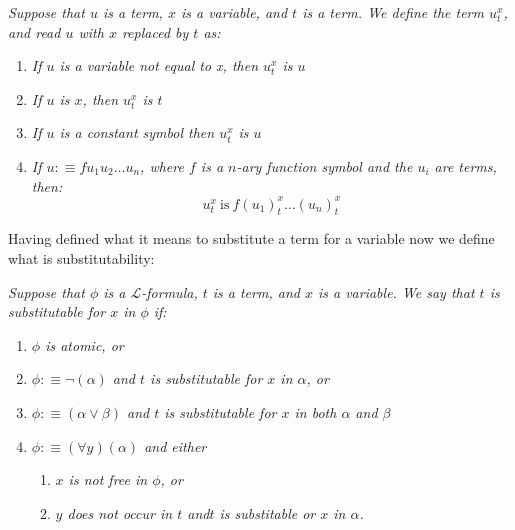 \documentclass[10pt,a4paper]{article}
\newcommand{\curveL}{\mathcal{L}}
\begin{document}
                    \begin{define}
                        \textit{Suppose that $u$ is a term, $x$ is a variable, and $t$ is a term. We define the term $u_t^x$, and read $u$ with $x$ replaced by $t$ as:}
                        \begin{enumerate}
                            \item \textit{If $u$ is a variable not equal to x, then $u_t^x$ is $u$}
                            \item \textit{If $u$ is $x$, then $u_t^x$ is $t$}
                            \item \textit{If $u$ is a constant symbol then $u_t^x$ is $u$}
                            \item \textit{If $u:\equiv fu_1u_2\dots u_n$, where $f$ is a $n$-ary function symbol and the $u_i$ are terms, then:}
                            \begin{equation}
                                u_t^x \ \text{is} \ f(u_1)_t^x\dots(u_n)_t^x
                            \end{equation}
                        \end{enumerate}
                    \end{define}
                    Having defined what it means to substitute a term for a variable now we define what is substitutability:
                    \begin{define}
                        \textit{Suppose that $\phi$ is a $\curveL$-formula, $t$ is a term, and $x$ is a variable. We say that $t$ is substitutable for $x$ in $\phi$ if:}
                        \begin{enumerate}
                            \item \textit{$\phi$ is atomic, or}
                            \item \textit{$\phi :\equiv \neg(\alpha)$ and $t$ is substitutable for $x$ in $\alpha$, or}
                            \item \textit{$\phi:\equiv (\alpha\lor\beta)$ and $t$ is substitutable for $x$ in both $\alpha$ and $\beta$}
                            \item \textit{$\phi:\equiv (\forall y)(\alpha)$ and either}
                            \begin{enumerate}
                                \item \textit{$x$ is not free in $\phi$, or}
                                \item \textit{$y$ does not occur in $t$ and$t$ is substitable or $x$ in $\alpha$.}
                            \end{enumerate}
                        \end{enumerate}
                    \end{define}
\end{document}
